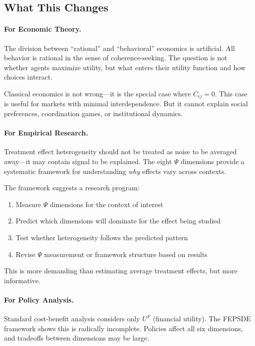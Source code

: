 \documentclass[12pt,a4paper]{article}
\begin{document}
\subsection{What This Changes}

\paragraph{For Economic Theory.}
The division between ``rational'' and ``behavioral'' economics is artificial. All behavior is rational in the sense of coherence-seeking. The question is not whether agents maximize utility, but what enters their utility function and how choices interact.

Classical economics is not wrong---it is the special case where $C_{ij} = 0$.
This case is useful for markets with minimal interdependence.
But it cannot explain social preferences, coordination games, or institutional dynamics.

\paragraph{For Empirical Research.}
Treatment effect heterogeneity should not be treated as noise to be averaged away---it may contain signal to be explained. The eight $\Psi$ dimensions provide a systematic framework for understanding \emph{why} effects vary across contexts.

The framework suggests a research program:
\begin{enumerate}
    \item Measure $\Psi$ dimensions for the context of interest
    \item Predict which dimensions will dominate for the effect being studied
    \item Test whether heterogeneity follows the predicted pattern
    \item Revise $\Psi$ measurement or framework structure based on results
\end{enumerate}

This is more demanding than estimating average treatment effects, but more informative.

\paragraph{For Policy Analysis.}
Standard cost-benefit analysis considers only $U^F$ (financial utility).
The FEPSDE framework shows this is radically incomplete.
Policies affect all six dimensions, and tradeoffs between dimensions may be large.
\end{document}
